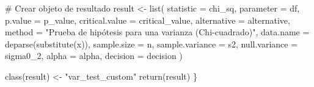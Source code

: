 \documentclass[
  spanish,
  letterpaper,
]{book}
\newenvironment{Shaded}{\begin{snugshade}}{\end{snugshade}}
\newcommand{\AttributeTok}[1]{\textcolor[rgb]{0.40,0.45,0.13}{#1}}
\newcommand{\CommentTok}[1]{\textcolor[rgb]{0.37,0.37,0.37}{#1}}
\newcommand{\FunctionTok}[1]{\textcolor[rgb]{0.28,0.35,0.67}{#1}}
\newcommand{\NormalTok}[1]{\textcolor[rgb]{0.00,0.23,0.31}{#1}}
\newcommand{\OtherTok}[1]{\textcolor[rgb]{0.00,0.23,0.31}{#1}}
\newcommand{\StringTok}[1]{\textcolor[rgb]{0.13,0.47,0.30}{#1}}
\begin{document}
\begin{Shaded}
\begin{Highlighting}[]
  \CommentTok{\# Crear objeto de resultado}
\NormalTok{  result }\OtherTok{\textless{}{-}} \FunctionTok{list}\NormalTok{(}
    \AttributeTok{statistic =}\NormalTok{ chi\_sq,}
    \AttributeTok{parameter =}\NormalTok{ df,}
    \AttributeTok{p.value =}\NormalTok{ p\_value,}
    \AttributeTok{critical.value =}\NormalTok{ critical\_value,}
    \AttributeTok{alternative =}\NormalTok{ alternative,}
    \AttributeTok{method =} \StringTok{"Prueba de hipótesis para una varianza (Chi{-}cuadrado)"}\NormalTok{,}
    \AttributeTok{data.name =} \FunctionTok{deparse}\NormalTok{(}\FunctionTok{substitute}\NormalTok{(x)),}
    \AttributeTok{sample.size =}\NormalTok{ n,}
    \AttributeTok{sample.variance =}\NormalTok{ s2,}
    \AttributeTok{null.variance =}\NormalTok{ sigma0\_2,}
    \AttributeTok{alpha =}\NormalTok{ alpha,}
    \AttributeTok{decision =}\NormalTok{ decision}
\NormalTok{  )}
  
  \FunctionTok{class}\NormalTok{(result) }\OtherTok{\textless{}{-}} \StringTok{"var\_test\_custom"}
  \FunctionTok{return}\NormalTok{(result)}
\NormalTok{\}}


\end{Highlighting}
\end{Shaded}
\end{document}
